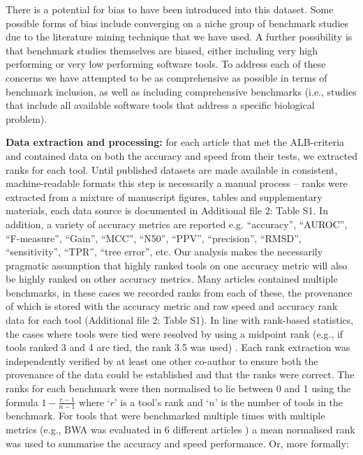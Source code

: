 \documentclass{bmcart}
\begin{document}
There is a potential for bias to have been introduced into this
dataset. Some possible forms of bias include converging on a niche
group of benchmark studies due to the literature mining technique that
we have used. A further possibility is that benchmark studies
themselves are biased, either including very high performing or very
low performing software tools. To address each of these concerns we
have attempted to be as comprehensive as possible in terms of
benchmark inclusion, as well as including comprehensive benchmarks (i.e.,
studies that include all available software tools that
address a specific biological problem).

\textbf{Data extraction and processing:} for each article that met the
ALB-criteria and contained data on both the accuracy and speed from
their tests, we extracted ranks for each tool. {\color{black}Until
  published datasets are made available in consistent,
  machine-readable formats this step is necessarily a manual process
  -- ranks were extracted from a mixture of manuscript figures, tables
  and supplementary materials, each data source is documented in
 Additional file 2: Table S1. In addition, a variety of
  accuracy metrics are reported e.g. ``accuracy'', ``AUROC'',
  ``F-measure'', ``Gain'', ``MCC'', ``N50'', ``PPV'', ``precision'',
  ``RMSD'', ``sensitivity'', ``TPR'', ``tree error'', etc. Our
  analysis makes the necessarily pragmatic assumption that highly
  ranked tools on one accuracy metric will also be highly ranked on
  other accuracy metrics.}  Many articles contained multiple
benchmarks, in these cases we recorded ranks from each of these, the
provenance of which is stored with the accuracy metric and raw speed
and accuracy rank data for each tool {\color{black}(Additional file 2:
  Table S1)}. In line with rank-based statistics, the cases where
tools were tied were resolved by using a midpoint rank (e.g., if tools
ranked 3 and 4 are tied, the rank 3.5 was used)
\cite{Mann1947-re}. Each rank extraction was independently verified by
at least one other co-author to ensure both the provenance of the data
could be established and that the ranks were correct. The ranks for
each benchmark were then normalised to lie between 0 and 1 using the
formula $1-\frac{r-1}{n-1}$ where ‘$r$’ is a tool’s rank and ‘$n$’ is
the number of tools in the benchmark. For tools that were benchmarked
multiple times with multiple metrics (e.g., BWA was evaluated in 6
different articles
\cite{Bao2011-lv,Caboche2014-lj,Hatem2013-cs,Schbath2012-ob,Ruffalo2011-rl,Holtgrewe2011-fd})
a mean normalised rank was used to summarise the accuracy and speed
performance.  Or, more formally:
 
\end{document}
